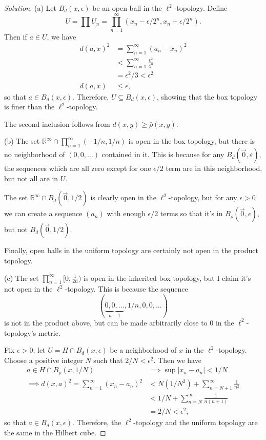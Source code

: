 \documentclass{article}
\theoremstyle{definition}
\begin{document}
\begin{proof}[Solution]
  (a) Let $B_d(x,\epsilon)$ be an open ball in the $\ell^2$-topology. Define
  $$U = \prod U_n = \prod_{n=1}^{\infty}(x_n - \epsilon/2^n, x_n + \epsilon/2^n).$$
  Then if $a\in U$, we have
  \begin{align*}
    d(a,x)^2 &= \sum_{n=1}^{\infty}(a_n-x_n)^2 \\
    &< \sum_{n=1}^{\infty}\frac{\epsilon^2}{4^n} \\
    &= \epsilon^2 / 3 < \epsilon^2 \\
    d(a,x) &\le \epsilon,
  \end{align*}
  so that $a\in B_d(x,\epsilon)$. Therefore, $U\subseteq B_d(x,\epsilon)$, showing that the box topology is finer than the $\ell^2$-topology.

  The second inclusion follows from $d(x,y)\ge \bar{\rho}(x,y)$.

  (b) The set $\mathbb{R}^\infty\cap\prod_{n=1}^{\infty} (-1/n,1/n)$ is open in the box topology, but there is no neighborhood of $(0,0,\dots)$ contained in it. This is because for any $B_d(\vec{0},\varepsilon)$, the sequences which are all zero except for one $\epsilon/2$ term are in this neighborhood, but not all are in $U$.

  The set $\mathbb{R}^\infty\cap B_d(\vec{0}, 1/2)$ is clearly open in the $\ell^2$-topology, but for any $\epsilon > 0$ we can create a sequence $(a_n)$ with enough $\epsilon/2$ terms so that it's in $B_{\bar{\rho}}(\vec{0},\epsilon)$, but not $B_d(\vec{0}, 1/2)$.

  Finally, open balls in the uniform topology are certainly not open in the product topology.

  (c) The set $\prod_{n=1}^\infty [0,\frac{1}{2n})$ is open in the inherited box topology, but I claim it's not open in the $\ell^2$-topology. This is because the sequence
  $$(\underbrace{0,0,\dots}_{\text{$n-1$}},1/n,0,0,\dots)$$
  is not in the product above, but can be made arbitrarily close to 0 in the $\ell^2$-topology's metric.

  Fix $\epsilon>0$; let $U = H\cap B_{d}(x,\epsilon)$ be a neighborhood of $x$ in the $\ell^2$-topology. Choose a positive integer $N$ such that $2/N < \epsilon^2$. Then we have
  \begin{align*}
    a\in H\cap B_{\bar{\rho}}(x,1/N) &\implies \sup |x_n - a_n| < 1/N \\
    \implies d(x,a)^2 = \sum_{n=1}^{\infty}(x_n - a_n)^2 &< N(1/N^2) + \sum_{n=N+1}^{\infty}\frac{1}{n^2} \\
    &< 1/N + \sum_{n=N}^{\infty}\frac{1}{n(n+1)} \\
    &= 2/N < \epsilon^2,
  \end{align*}
  so that $a\in B_d(x,\epsilon)$. Therefore, the $\ell^2$-topology and the uniform topology are the same in the Hilbert cube.


\end{proof}
\end{document}

